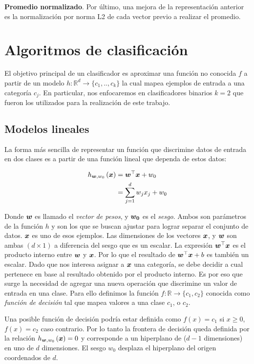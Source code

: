 \textbf{Promedio normalizado}. Por último, una mejora de la representación
anterior es la normalización por norma L2 de cada vector previo a realizar el
promedio.

\section{Algoritmos de clasificación}

El objetivo principal de un clasificador es aproximar una función no conocida
$f$ a partir de un modelo $h: \mathbb{R}^d \rightarrow \{c_1,.., c_k\}$ la cual
mapea ejemplos de entrada a una categoría $c_j$. En particular, nos enfocaremos
en clasificadores binarios $k = 2$ que fueron los utilizados para la realización
de este trabajo.

\subsection{Modelos lineales}

La forma más sencilla de representar un función que discrimine datos de entrada
en dos clases es a partir de una función lineal que dependa de estos datos:

\begin{align}
    h_{\boldsymbol{w}, w_0}\left( \boldsymbol{x} \right) &= \boldsymbol{w}^{\top} \boldsymbol{x} + w_0 \\
                                           &= \sum_{j = 1 }^{d} w_j x_j + w_0
\end{align}

Donde $\boldsymbol{w}$ es llamado el \emph{vector de pesos}, y $\boldsymbol{w_0}$ es el
\emph{sesgo}. Ambos son parámetros de la función $h$ y son los que se buscan
ajustar para lograr separar el conjunto de datos. $\boldsymbol{x}$ es uno de esos
ejemplos. Las dimensiones de los vectores $\boldsymbol{x}$, y $\boldsymbol{w}$ son ambas $(d
\times 1)$ a diferencia del sesgo que es un escalar. La expresión
$\boldsymbol{w}^{\top} \boldsymbol{x}$ es el producto interno entre $\boldsymbol{w}$ y $\boldsymbol{x}$.
Por lo que el resultado de $\boldsymbol{w}^{\top} \boldsymbol{x} + b$ es también un escalar.
Dado que nos interesa asignar a $\boldsymbol{x}$ una categoría, se debe decidir a cual
pertenece en base al resultado obtenido por el producto interno. Es por eso que
surge la necesidad de agregar una nueva operación que discrimine un valor de
entrada en una clase. Para ello definimos la función $f: \mathbb{R} \rightarrow
\{c_1, c_2\}$ conocida como \emph{función de decisión} tal que mapea valores a
una clase $c_1$, o $c_2$.

Una posible función de decisión podría estar definida como $f(x) = c_1$ si $x
\geq 0$, $f(x) = c_2$ caso contrario. Por lo tanto la frontera de decisión queda
definida por la relación $h_{\boldsymbol{w}, w_0}\left( \boldsymbol{x} \right) = 0$ y
corresponde a un hiperplano de ($d-1$ dimensiones) en uno de $d$ dimensiones. El
sesgo $w_0$ desplaza el hiperplano del origen coordenados de $d$.

